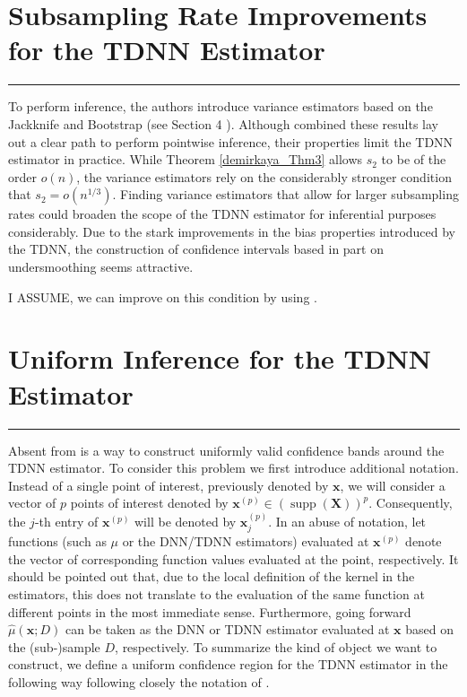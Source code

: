 \documentclass[letterpaper,10pt]{article}
\numberwithin{equation}{section}
\numberwithin{theorem}{section}
\theoremstyle{definition}
\renewcommand{\hat}{\widehat}
\newcommand{\1}{\mathbb{1}}
\begin{document}
\section{Subsampling Rate Improvements for the TDNN Estimator}\label{Subsampling_Improvements}
\hrule
To perform inference, the authors introduce variance estimators based on the Jackknife and Bootstrap (see Section 4 \citet{demirkaya_optimal_2024}).
Although combined these results lay out a clear path to perform pointwise inference, their properties limit the TDNN estimator in practice.
While Theorem \ref{demirkaya_Thm3} allows $s_2$ to be of the order $o(n)$, the variance estimators rely on the considerably stronger condition that $s_2 = o(n^{1/3})$.
Finding variance estimators that allow for larger subsampling rates could broaden the scope of the TDNN estimator for inferential purposes considerably.
Due to the stark improvements in the bias properties introduced by the TDNN, the construction of confidence intervals based in part on undersmoothing seems attractive.

{\color{red}I ASSUME, we can improve on this condition by using \citet{ritzwoller_uniform_2024}.}

\newpage
\section{Uniform Inference for the TDNN Estimator}\label{UnifInf}
\hrule
Absent from \citet{demirkaya_optimal_2024} is a way to construct uniformly valid confidence bands around the TDNN estimator.
To consider this problem we first introduce additional notation.
Instead of a single point of interest, previously denoted by $\mathbf{x}$, we will consider a vector of $p$ points of interest denoted by $\mathbf{x}^{(p)} \in \left(\operatorname{supp}\left(\mathbf{X}\right)\right)^{p}$.
Consequently, the $j$-th entry of $\mathbf{x}^{(p)}$ will be denoted by $\mathbf{x}^{(p)}_{j}$.
In an abuse of notation, let functions (such as $\mu$ or the DNN/TDNN estimators) evaluated at $\mathbf{x}^{(p)}$ denote the vector of corresponding function values evaluated at the point, respectively.
It should be pointed out that, due to the local definition of the kernel in the estimators, this does not translate to the evaluation of the same function at different points in the most immediate sense.
Furthermore, going forward $\hat{\mu}\left(\mathbf{x}; D\right)$ can be taken as the DNN or TDNN estimator evaluated at $\mathbf{x}$ based on the (sub-)sample $D$, respectively.
To summarize the kind of object we want to construct, we define a uniform confidence region for the TDNN estimator in the following way following closely the notation of \citet{ritzwoller_uniform_2024}.
\end{document}

